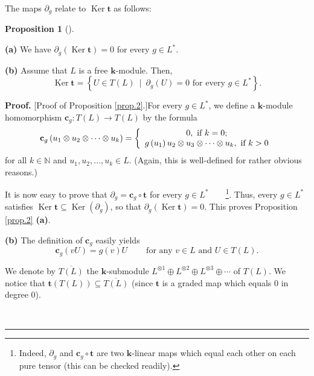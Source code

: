\documentclass[numbers=enddot,12pt,final,onecolumn,notitlepage]{scrartcl}%
\theoremstyle{definition}
\newtheorem{prop}[theo]{Proposition}
\newenvironment{proposition}[1][]
{\begin{prop}[#1]\begin{leftbar}}
{\end{leftbar}\end{prop}}
\newenvironment{proof}[1][Proof]{\noindent\textbf{#1.} }{\ \rule{0.5em}{0.5em}}
\begin{document}
The maps $\partial_{g}$ relate to $\operatorname*{Ker}\mathbf{t}$ as follows:

\begin{proposition}
\label{prop.2} \textbf{(a)} We have $\partial_{g}\left(  \operatorname{Ker}%
\mathbf{t}\right)  =0$ for every $g\in L^{\ast}$. \medskip

\textbf{(b)} Assume that $L$ is a free $\mathbf{k}$-module. Then,%
\[
\operatorname*{Ker}\mathbf{t}=\left\{  U\in T\left(  L\right)  \ \mid
\ \partial_{g}\left(  U\right)  =0\text{ for every }g\in L^{\ast}\right\}  .
\]

\end{proposition}

\begin{proof}
[Proof of Proposition \ref{prop.2}.]For every $g\in L^{\ast}$, we define a
$\mathbf{k}$-module homomorphism $\mathbf{c}_{g}:T\left(  L\right)
\rightarrow T\left(  L\right)  $ by the formula%
\[
\mathbf{c}_{g}\left(  u_{1}\otimes u_{2}\otimes\cdots\otimes u_{k}\right)
=\left\{
\begin{array}
[c]{c}%
0,\text{ if }k=0;\\
g\left(  u_{1}\right)  u_{2}\otimes u_{3}\otimes\cdots\otimes u_{k},\text{ if
}k>0
\end{array}
\right.
\]
for all $k\in\mathbb{N}$ and $u_{1},u_{2},\ldots,u_{k}\in L$. (Again, this is
well-defined for rather obvious reasons.)

It is now easy to prove that $\partial_{g}=\mathbf{c}_{g}\circ\mathbf{t}$ for
every $g\in L^{\ast}$\ \ \ \ \footnote{Indeed, $\partial_{g}$ and
$\mathbf{c}_{g}\circ\mathbf{t}$ are two $\mathbf{k}$-linear maps which equal
each other on each pure tensor (this can be checked readily).}. Thus, every
$g\in L^{\ast}$ satisfies $\operatorname{Ker}\mathbf{t}\subseteq
\operatorname{Ker}\left(  \partial_{g}\right)  $, so that $\partial_{g}\left(
\operatorname{Ker}\mathbf{t}\right)  =0$. This proves Proposition \ref{prop.2}
\textbf{(a)}. \medskip

\textbf{(b)} The definition of $\mathbf{c}_{g}$ easily yields%
\begin{equation}
\mathbf{c}_{g}\left(  vU\right)  =g\left(  v\right)
U\ \ \ \ \ \ \ \ \ \ \text{for any }v\in L\text{ and }U\in T\left(  L\right)
. \label{pf.prop.2.1}%
\end{equation}


We denote by $\overline{T\left(  L\right)  }$ the $\mathbf{k}$-submodule
$L^{\otimes1}\oplus L^{\otimes2}\oplus L^{\otimes3}\oplus\cdots$ of $T\left(
L\right)  $. We notice that $\mathbf{t}\left(  T\left(  L\right)  \right)
\subseteq\overline{T\left(  L\right)  }$ (since $\mathbf{t}$ is a graded map
which equals $0$ in degree $0$).


\end{proof}
\end{document}
